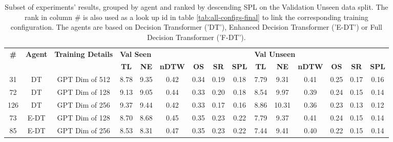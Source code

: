 \begin{table}
\centering
\caption{\label{tab:dim_test}Subset of experiments' results, grouped by agent and ranked by descending SPL on the Validation Unseen data split. The rank in column \# is also used as a look up id in table \ref{tab:all-configs-final} to link the corresponding training configuration.     \newline The agents are based on Decision Transformer ('DT'), Enhanced Decision Transformer ('E-DT') or Full Decision Transformer ('F-DT').}
\begin{tabular}{@{\hskip3pt}c@{\hskip3pt}c@{\hskip3pt}c@{\hskip3pt}c@{\hskip3pt}c@{\hskip3pt}c@{\hskip3pt}c@{\hskip3pt}c@{\hskip3pt}c@{\hskip3pt}c@{\hskip3pt}c@{\hskip3pt}c@{\hskip3pt}c@{\hskip3pt}c@{\hskip3pt}c}
\toprule
\textbf{\#} & \textbf{Agent} & \textbf{Training Details} & \multicolumn{6}{l}{\textbf{Val Seen}} & \multicolumn{6}{l}{\textbf{Val Unseen}} \\
 \textbf{~} &     \textbf{~} &                \textbf{~} &       \textbf{TL} & \textbf{NE} & \textbf{nDTW} & \textbf{OS} & \textbf{SR} & \textbf{SPL} &         \textbf{TL} & \textbf{NE} & \textbf{nDTW} & \textbf{OS} & \textbf{SR} & \textbf{SPL} \\
\midrule
         31 &             DT &            GPT Dim of 512 &              8.78 &        9.35 &          0.42 &        0.34 &        0.19 &         0.18 &                7.79 &        9.31 &          0.41 &        0.25 &        0.17 &         0.16 \\
         72 &             DT &            GPT Dim of 128 &              9.13 &        9.05 &          0.44 &        0.33 &        0.20 &         0.18 &                8.54 &        9.97 &          0.39 &        0.24 &        0.15 &         0.14 \\
        126 &             DT &            GPT Dim of 256 &              9.37 &        9.44 &          0.42 &        0.33 &        0.17 &         0.16 &                8.86 &       10.31 &          0.36 &        0.23 &        0.13 &         0.12 \\
         73 &           E-DT &            GPT Dim of 128 &              8.70 &        8.68 &          0.45 &        0.35 &        0.23 &         0.22 &                7.79 &        9.37 &          0.41 &        0.24 &        0.15 &         0.14 \\
         85 &           E-DT &            GPT Dim of 256 &              8.53 &        8.31 &          0.47 &        0.35 &        0.23 &         0.22 &                7.44 &        9.41 &          0.40 &        0.22 &        0.15 &         0.14 \\

\end{tabular}
\end{table}
